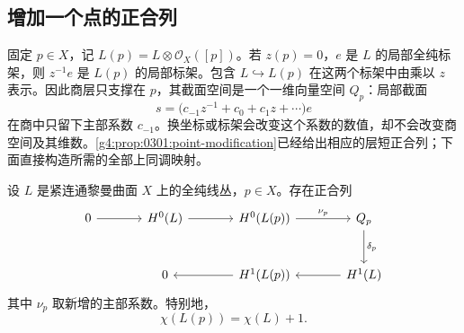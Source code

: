 \subsection{增加一个点的正合列}
\label{g4:subsec:0304:02}

固定 \(p\in X\)，记 \(L(p)=L\otimes\mathcal O_X([p])\)。若 \(z(p)=0\)，\(e\) 是 \(L\) 的局部全纯标架，则 \(z^{-1}e\) 是 \(L(p)\) 的局部标架。包含 \(L\hookrightarrow L(p)\) 在这两个标架中由乘以 \(z\) 表示。因此商层只支撑在 \(p\)，其截面空间是一个一维向量空间 \(Q_p\)：局部截面
\[
	s=\bigl(c_{-1}z^{-1}+c_0+c_1z+\cdots\bigr)e
\]
在商中只留下主部系数 \(c_{-1}\)。换坐标或标架会改变这个系数的数值，却不会改变商空间及其维数。\cref{g4:prop:0301:point-modification}已经给出相应的层短正合列；下面直接构造所需的全部上同调映射。

\begin{theorem}
	\label{g4:thm:0304:point-exact}
	设 \(L\) 是紧连通黎曼曲面 \(X\) 上的全纯线丛，\(p\in X\)。存在正合列
	\[
		\begin{tikzcd}[column sep=large,row sep=large]
			0\arrow[r]&H^0(L)\arrow[r]&H^0(L(p))\arrow[r,"\nu_p"]&Q_p\arrow[d,"\delta_p"]\\
			&0&H^1(L(p))\arrow[l]&H^1(L)\arrow[l]
		\end{tikzcd}
	\]
	其中 \(\nu_p\) 取新增的主部系数。特别地，
	\begin{equation}
		\label{g4:eq:0304:point-euler}
		\chi(L(p))=\chi(L)+1.
	\end{equation}
\end{theorem}
